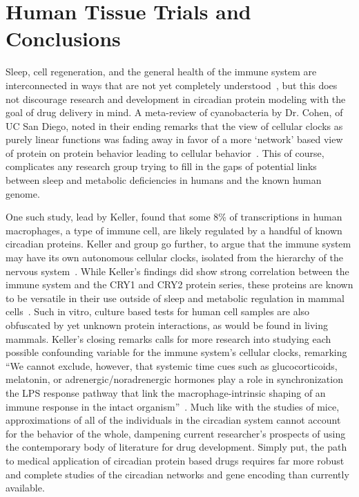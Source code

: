 \documentclass [12pt]{article}
\begin{document}
\section{Human Tissue Trials and Conclusions}
	\indent Sleep, cell regeneration, and the general health of the immune system are interconnected in ways that are not yet completely understood~\autocite{Keller2009}, but this does not discourage research and development in circadian protein modeling with the goal of drug delivery in mind. A meta-review of cyanobacteria by Dr. Cohen, of UC San Diego, noted  in their ending remarks that the view of cellular clocks as purely linear functions was fading away in favor of a more {`}network' based view of protein on protein behavior leading to cellular behavior~\autocite{Cohen2015}. This of course, complicates any research group trying to fill in the gaps of potential links between sleep and metabolic deficiencies in humans and the known human genome. \par
	\indent One such study, lead by Keller, found that some 8\% of transcriptions in human macrophages, a type of immune cell, are likely regulated by a handful of known circadian proteins. Keller and group go further, to argue that the immune system may have its own autonomous cellular clocks, isolated from the hierarchy of the nervous system~\autocite{Keller2009}. While Keller's findings did show strong correlation between the immune system and the CRY1 and CRY2 protein series, these proteins are known to be versatile in their use outside of sleep and metabolic regulation in mammal cells~\autocite{Yamajuku2011}. Such in vitro, culture based tests for human cell samples are also obfuscated by yet unknown protein interactions, as would be found in living mammals. Keller's closing remarks calls for more research into studying each possible confounding variable for the immune system's cellular clocks, remarking {``}We cannot exclude, however, that systemic time cues such as glucocorticoids, melatonin, or adrenergic/noradrenergic hormones play a role in synchronization the LPS response pathway that link the macrophage-intrinsic shaping of an immune response in the intact organism''~\autocite{Keller2009}. Much like with the studies of mice, approximations of all of the  individuals in the circadian system cannot account for the behavior of the whole, dampening current researcher's prospects of using the contemporary body of literature for drug development. Simply put, the path to medical application of circadian protein based drugs requires far more robust and complete studies of the circadian networks and gene encoding than currently available.
\newpage
\end{document}
